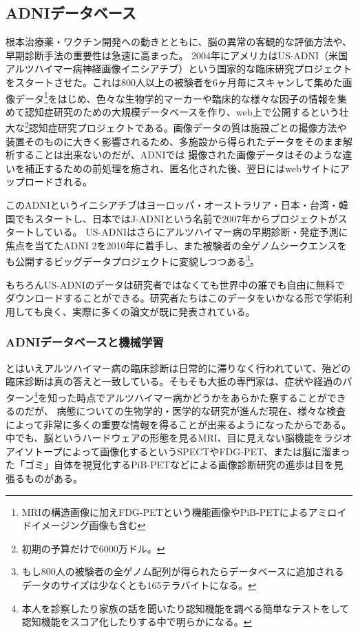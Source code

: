 \subsection{ADNIデータベース}
根本治療薬・ワクチン開発への動きとともに、脳の異常の客観的な評価方法や、早期診断手法の重要性は急速に高まった。
2004年にアメリカはUS-ADNI（米国アルツハイマー病神経画像イニシアチブ）という国家的な臨床研究プロジェクトをスタートさせた。これは800人以上の被験者を6ヶ月毎にスキャンして集めた画像データ\footnote{
MRIの構造画像に加えFDG-PETという機能画像やPiB-PETによるアミロイドイメージング画像も含む}をはじめ、色々な生物学的マーカーや臨床的な様々な因子の情報を集めて認知症研究のための大規模データベースを作り、web上で公開するという壮大な\footnote{初期の予算だけで6000万ドル。}認知症研究プロジェクトである。画像データの質は施設ごとの撮像方法や装置そのものに大きく影響されるため、多施設から得られたデータをそのまま解析することは出来ないのだが、ADNIでは
撮像された画像データはそのような違いを補正するための前処理を施され、匿名化された後、翌日にはwebサイトにアップロードされる。

このADNIというイニシアチブはヨーロッパ・オーストラリア・日本・台湾・韓国でもスタートし、日本ではJ-ADNIという名前で2007年からプロジェクトがスタートしている。
US-ADNIはさらにアルツハイマー病の早期診断・発症予測に焦点を当てたADNI 2を2010年に着手し、また被験者の全ゲノムシークエンスをも公開するビッグデータプロジェクトに変貌しつつある\footnote{もし800人の被験者の全ゲノム配列が得られたらデータベースに追加されるデータのサイズは少なくとも165テラバイトになる。}。

もちろんUS-ADNIのデータは研究者ではなくても世界中の誰でも自由に無料でダウンロードすることができる。研究者たちはこのデータをいかなる形で学術利用しても良く、実際に多くの論文が既に発表されている。

\subsubsection{ADNIデータベースと機械学習}



とはいえアルツハイマー病の臨床診断は日常的に滞りなく行われていて、殆どの臨床診断は真の答えと一致している。そもそも大抵の専門家は、症状や経過のパターン\footnote{本人を診察したり家族の話を聞いたり認知機能を調べる簡単なテストをして認知機能をスコア化したりする中で明らかになる。}を知った時点でアルツハイマー病かどうかをあらかた察することができるのだが、
病態についての生物学的・医学的な研究が進んだ現在、様々な検査によって非常に多くの重要な情報を得ることが出来るようになったからである。中でも、脳というハードウェアの形態を見るMRI、目に見えない脳機能をラジオアイソトープによって画像化するというSPECTやFDG-PET、または脳に溜まった「ゴミ」自体を視覚化するPiB-PETなどによる画像診断研究の進歩は目を見張るものがある。


